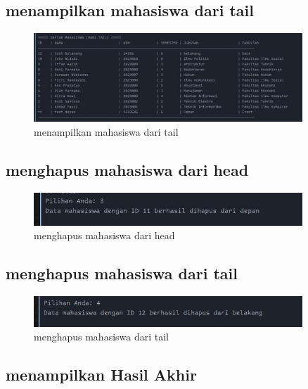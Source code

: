 \documentclass{article}
\begin{document}
\subsection{menampilkan mahasiswa dari tail}

\begin{figure}[H]
\centering
\includegraphics[width=0.9\textwidth]{images/gambar6.jpg}
\caption{menampilkan mahasiswa dari tail}
\label{fig:sample-image}
\end{figure}

\subsection{menghapus mahasiswa dari head}

\begin{figure}[H]
\centering
\includegraphics[width=0.9\textwidth]{images/gambar8.jpg}
\caption{menghapus mahasiswa dari head}
\label{fig:sample-image}
\end{figure}

\subsection{menghapus mahasiswa dari tail}

\begin{figure}[H]
\centering
\includegraphics[width=0.9\textwidth]{images/gambar7.jpg}
\caption{menghapus mahasiswa dari tail}
\label{fig:sample-image}
\end{figure}

\subsection{menampilkan Hasil Akhir}
\end{document}
